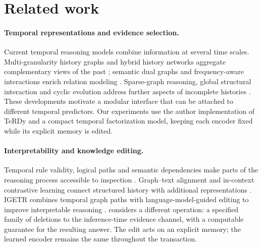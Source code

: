 \section{Related work}
\paragraph{Temporal representations and evidence selection.}
Current temporal reasoning models combine information at several time scales. Multi-granularity history graphs and hybrid history networks aggregate complementary views of the past \citep{zhu2025multigran,ye2026dualhistory}; semantic dual graphs and frequency-aware interactions enrich relation modeling \citep{zhang2026dstag,wang2026multidim}. Sparse-graph reasoning, global structural interaction and cyclic evolution address further aspects of incomplete histories \citep{peng2026icpe,wang2026globalinteraction,bi2026globallocal}. These developments motivate a modular interface that can be attached to different temporal predictors. Our experiments use the author implementation of TeRDy \citep{liu2025terdy} and a compact temporal factorization model, keeping each encoder fixed while its explicit memory is edited.

\paragraph{Interpretability and knowledge editing.}
Temporal rule validity, logical paths and semantic dependencies make parts of the reasoning process accessible to inspection \citep{pan2025validity,zhang2026logicalpaths,yu2026dependency}. Graph--text alignment and in-context contrastive learning connect structured history with additional representations \citep{wan2026tgcallm,li2026calendar}. IGETR combines temporal graph paths with language-model-guided editing to improve interpretable reasoning \citep{fan2026editing}. \StableKG{} considers a different operation: a specified family of deletions to the inference-time evidence channel, with a computable guarantee for the resulting answer. The edit acts on an explicit memory; the learned encoder remains the same throughout the transaction.

